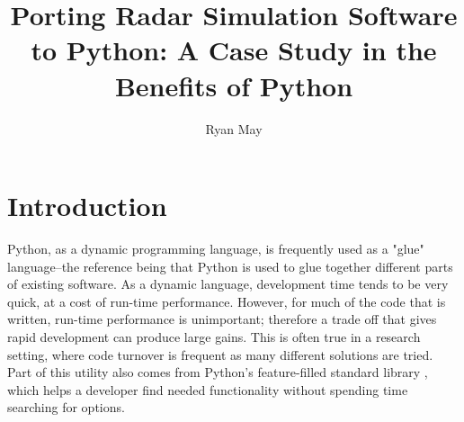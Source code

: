 \documentclass[twocolumn]{article}
\title{Porting Radar Simulation Software to Python: A Case Study in the Benefits of Python}
\author{Ryan May}
\affil{Enterprise Electronics Corporation\\Norman, OK}
\date{}
\begin{document}
\maketitle



\section{Introduction}
Python, as a dynamic programming language, is frequently used as a "glue"
language--the reference being that Python is used to glue together different parts
of existing software. As a dynamic language, development time tends to be very
quick, at a cost of run-time performance. However, for much of the code that is
written, run-time performance is unimportant; therefore a trade off that
gives rapid development can produce large gains. This is often true in a research
setting, where code turnover is frequent as many different solutions are tried.
Part of this utility also comes from Python's feature-filled standard library
\cite{pythonlib}, which helps a developer find needed functionality without
spending time searching for options.
\end{document}
